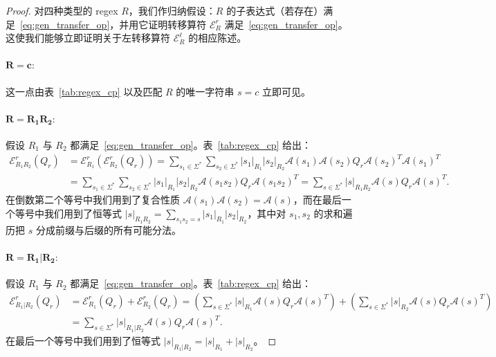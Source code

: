 \documentclass[twoside]{article}
\newcommand{\EL}{\mc{E}^{\scriptstyle \ell}}
\newcommand{\ER}{\mc{E}^{\scriptstyle r}}
\newcommand{\QR}{Q_{r}}
\newcommand{\sRone}{|s_1|_{R_1}}
\newcommand{\sRtwo}{|s_2|_{R_2}}
\newcommand{\mc}[1]{\mathcal{#1}}
\begin{document}
\begin{proof}

对四种类型的 regex $R$，我们作归纳假设：$R$ 的子表达式（若存在）满足~\eqref{eq:gen_transfer_op}，并用它证明转移算符 $\ER_R$ 满足~\eqref{eq:gen_transfer_op}。这使我们能够立即证明关于左转移算符 $\EL_R$ 的相应陈述。

\paragraph{$\mathbf{R = c:}$} 这一点由表~\ref{tab:regex_cp}
以及匹配 $R$ 的唯一字符串 $s = c$ 立即可见。

\paragraph{$\mathbf{R = R_1 R_2:}$} 假设 $R_1$ 与 $R_2$ 都满足~\eqref{eq:gen_transfer_op}。表~\ref{tab:regex_cp}
给出：
%
\begin{align*}
    \ER_{R_1 R_2}(\QR) &= \ER_{R_1}(\ER_{R_2}(\QR)) = \sum_{s_1 \in \Sigma^*} \sum_{s_2 \in \Sigma^*} \sRone \sRtwo \mc{A}(s_1) \mc{A}(s_2) \QR \mc{A}(s_2)^T \mc{A}(s_1)^T \\
    &= \sum_{s_1 \in \Sigma^*} \sum_{s_2 \in \Sigma^*} \sRone \sRtwo \mc{A}(s_1 s_2) \QR \mc{A}(s_1 s_2)^T = \sum_{s \in \Sigma^*} |s|_{R_1\! R_2} \mc{A}(s) \QR \mc{A}(s)^T.
\end{align*}
%
在倒数第二个等号中我们用到了复合性质 $\mc{A}(s_1)\mc{A}(s_2) = \mc{A}(s)$，而在最后一个等号中我们用到了恒等式 $|s|_{R_1 R_2} = \sum_{s_1 s_2 = s} |s_1|_{R_1} |s_2|_{R_2}$，其中对 $s_1, s_2$ 的求和遍历把 $s$ 分成前缀与后缀的所有可能分法。

\paragraph{$\mathbf{R = R_1 | R_2:}$} 假设 $R_1$ 与 $R_2$ 都满足~\eqref{eq:gen_transfer_op}。表~\ref{tab:regex_cp}
给出：
%
\begin{align*}
    \ER_{R_1 | R_2}(\QR) &= \ER_{R_1}(\QR) + \ER_{R_2}(\QR) = \left(\sum_{s \in \Sigma^*} |s|_{R_1} \mc{A}(s) \QR \mc{A}(s)^T\right) + \left(\sum_{s \in \Sigma^*} |s|_{R_2} \mc{A}(s) \QR \mc{A}(s)^T\right) \\
    &= \sum_{s \in \Sigma^*} |s|_{R_1 | R_2} \mc{A}(s) \QR \mc{A}(s)^T.
\end{align*}
%
在最后一个等号中我们用到了恒等式 $|s|_{R_1 | R_2} = |s|_{R_1} + |s|_{R_2}$。


\end{proof}
\end{document}
